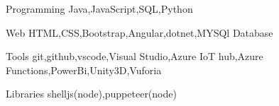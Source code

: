 
\begin{cvskills}

  \cvskill
    {Programming} %
    {Java,JavaScript,SQL,Python} %

  \cvskill
    {Web} %
    {HTML,CSS,Bootstrap,Angular,dotnet,MYSQl Database} %

  \cvskill
    {Tools} %
    {git,github,vscode,Visual Studio,Azure IoT hub,Azure Functions,PowerBi,Unity3D,Vuforia} %

    \cvskill
    {Libraries} %
    {shelljs(node),puppeteer(node)}
\end{cvskills}
